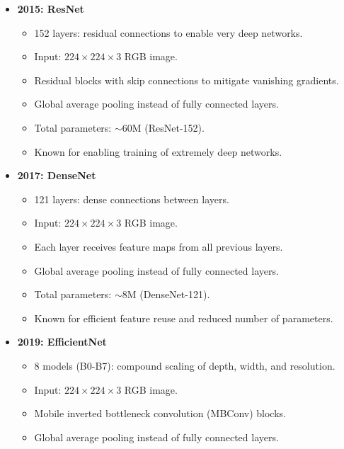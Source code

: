 \documentclass{article}
\begin{document}
\begin{itemize}[leftmargin=1.5em]
\begin{itemize}
        \item Total parameters: $\sim$6.8M.
        \item Introduced auxiliary classifiers for better gradient flow.
        \item Known for inception modules that allow multi-scale feature extraction.
    \end{itemize}
  \item \textbf{2015: ResNet} 
    \begin{itemize}
            \item 152 layers: residual connections to enable very deep networks.
            \item Input: $224 \times 224 \times 3$ RGB image.
            \item Residual blocks with skip connections to mitigate vanishing gradients.
            \item Global average pooling instead of fully connected layers.
            \item Total parameters: $\sim$60M (ResNet-152).
            \item Known for enabling training of extremely deep networks.
        \end{itemize}
  \item \textbf{2017: DenseNet} 
    \begin{itemize}
        \item 121 layers: dense connections between layers.
        \item Input: $224 \times 224 \times 3$ RGB image.
        \item Each layer receives feature maps from all previous layers.
        \item Global average pooling instead of fully connected layers.
        \item Total parameters: $\sim$8M (DenseNet-121).
        \item Known for efficient feature reuse and reduced number of parameters.
    \end{itemize}
  \item \textbf{2019: EfficientNet} 
    \begin{itemize}
        \item 8 models (B0-B7): compound scaling of depth, width, and resolution.
        \item Input: $224 \times 224 \times 3$ RGB image.
        \item Mobile inverted bottleneck convolution (MBConv) blocks.
        \item Global average pooling instead of fully connected layers.

\end{itemize}
\end{itemize}
\end{document}
